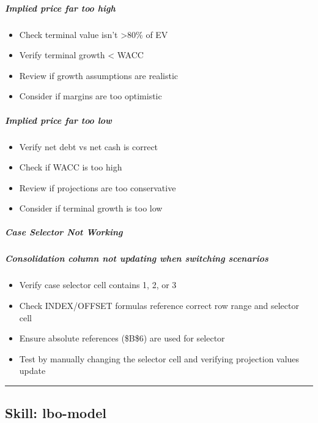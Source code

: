\documentclass[11pt]{article}
\begin{document}
\subparagraph{Implied price far too high}\mbox{}\par
\begin{itemize}[leftmargin=*,itemsep=2pt,topsep=2pt]
\item {} Check terminal value isn't >80\% of EV
\item {} Verify terminal growth < WACC
\item {} Review if growth assumptions are realistic
\item {} Consider if margins are too optimistic
\end{itemize}

\subparagraph{Implied price far too low}\mbox{}\par
\begin{itemize}[leftmargin=*,itemsep=2pt,topsep=2pt]
\item {} Verify net debt vs net cash is correct
\item {} Check if WACC is too high
\item {} Review if projections are too conservative
\item {} Consider if terminal growth is too low
\end{itemize}

\subparagraph{Case Selector Not Working}\mbox{}\par

\subparagraph{Consolidation column not updating when switching scenarios}\mbox{}\par
\begin{itemize}[leftmargin=*,itemsep=2pt,topsep=2pt]
\item {} Verify case selector cell contains 1, 2, or 3
\item {} Check INDEX/OFFSET formulas reference correct row range and selector cell
\item {} Ensure absolute references (\$B\$6) are used for selector
\item {} Test by manually changing the selector cell and verifying projection values update
\end{itemize}

\vspace{0.8em}\hrule\vspace{0.8em}

\subsection{Skill: lbo-model}\label{file:model-builder-skills-lbo-model-SKILL-md}
\end{document}
